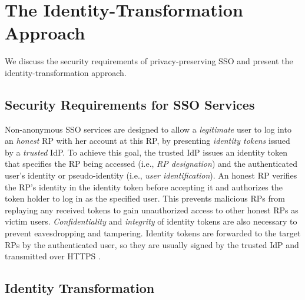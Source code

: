 \section{The Identity-Transformation Approach}
\label{sec:challenge}

We discuss the security requirements of privacy-preserving SSO and present the identity-transformation approach.


\subsection{Security Requirements for SSO Services}
\label{subsec:basicrequirements}

Non-anonymous SSO services \cite{OpenIDConnect,rfc6749,SAML,SAMLIdentifier,NIST2017draft} are designed to allow a \emph{legitimate} user to log into an \emph{honest} RP with her account at this RP, %
by presenting \emph{identity tokens} issued by a \emph{trusted} IdP.
To achieve this goal, the trusted IdP issues an identity token that specifies the RP being accessed (i.e., \emph{RP designation}) and the authenticated user's identity or pseudo-identity (i.e., \emph{user identification}).
An honest RP verifies the RP's identity in the identity token before accepting it and authorizes the token holder to log in as the specified user. This prevents malicious RPs from replaying any received tokens to gain unauthorized access to other honest RPs as victim users.
\emph{Confidentiality} and \emph{integrity} of identity tokens are also necessary to prevent eavesdropping and tampering. Identity tokens are forwarded to the target RPs by the authenticated user, so they are usually signed by the trusted IdP and transmitted over HTTPS \cite{OpenIDConnect, rfc6749, SAML}.


\subsection{Identity Transformation}
\label{subsec:solutions}


